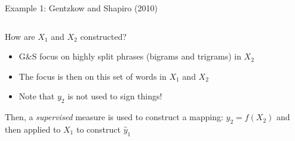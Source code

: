 \documentclass[notes,11pt, aspectratio=169]{beamer}
\newenvironment{wideitemize}{\itemize\addtolength{\itemsep}{10pt}}{\enditemize}
\begin{document}
\begin{frame}{Example 1: Gentzkow and Shapiro (2010)}
  \begin{columns}[onlytextwidth, T] %
    \begin{column}{.5\textwidth}
      \begin{wideitemize}
      \item How are $X_{1}$ and $X_{2}$ constructed?
        \begin{itemize}
        \item G\&S focus on highly split phrases (bigrams and trigrams) in $X_{2}$
        \item The focus is then on this set of words in $X_{1}$ and $X_{2}$
        \item Note that $y_{2}$ is not used to sign things!
        \end{itemize}
      \item Then, a \emph{supervised} measure is used to construct a
        mapping: $y_{2} = f(X_{2})$ and then applied to $X_{1}$ to
        construct $\hat{y}_{1}$
      \end{wideitemize}
    \end{column}%
    \hfill%
    \begin{column}{.5\textwidth}

\end{column}
\end{columns}
\end{frame}
\end{document}
